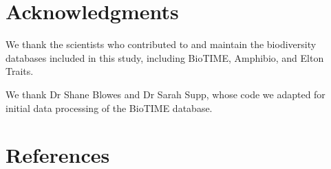 \documentclass{article}
\begin{document}
\hypertarget{acknowledgments}{%
\section{Acknowledgments}\label{acknowledgments}}

We thank the scientists who contributed to and maintain the biodiversity
databases included in this study, including BioTIME, Amphibio, and Elton
Traits.

We thank Dr Shane Blowes and Dr Sarah Supp, whose code we adapted for
initial data processing of the BioTIME database.

\hypertarget{references}{%
\section*{References}\label{references}}
\end{document}
